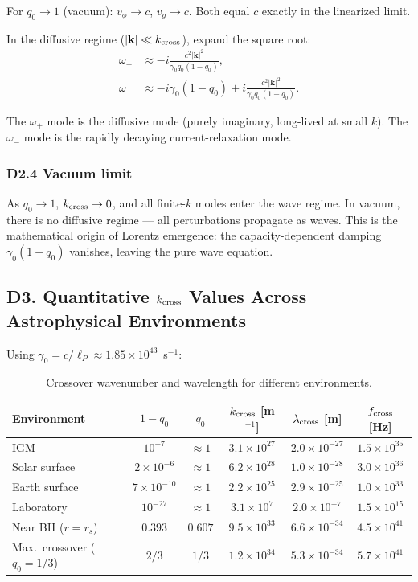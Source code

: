 \documentclass[reprint]{revtex4-2}
\begin{document}
For $q_0 \to 1$ (vacuum): $v_\phi \to c$, $v_g \to c$. Both equal $c$ exactly in the linearized limit.

In the diffusive regime ($|\mathbf{k}| \ll k_{\rm cross}$), expand the square root:
\begin{align}
\omega_+ &\approx -i\frac{c^2|\mathbf{k}|^2}{\gamma_0 q_0(1-q_0)}, \\
\omega_- &\approx -i\gamma_0(1-q_0) + i\frac{c^2|\mathbf{k}|^2}{\gamma_0 q_0(1-q_0)}.
\end{align}

The $\omega_+$ mode is the diffusive mode (purely imaginary, long-lived at small $k$). The $\omega_-$ mode is the rapidly decaying current-relaxation mode.

\subsubsection{D2.4 Vacuum limit}

As $q_0 \to 1$, $k_{\rm cross} \to 0$, and all finite-$k$ modes enter the wave regime. In vacuum, there is no diffusive regime --- all perturbations propagate as waves. This is the mathematical origin of Lorentz emergence: the capacity-dependent damping $\gamma_0(1-q_0)$ vanishes, leaving the pure wave equation.

\subsection{D3. Quantitative $k_{\rm cross}$ Values Across Astrophysical Environments}

Using $\gamma_0 = c/\ell_P \approx 1.85\times 10^{43}$~s$^{-1}$:

\begin{table}[h]
\caption{Crossover wavenumber and wavelength for different environments.}
\label{tab:kcross}
\small\setlength{\tabcolsep}{3pt}
\begin{tabular}{lccccc}
\toprule
Environment & $1-q_0$ & $q_0$ & $k_{\rm cross}$ [m$^{-1}$] & $\lambda_{\rm cross}$ [m] & $f_{\rm cross}$ [Hz] \\
\midrule
IGM & $10^{-7}$ & $\approx 1$ & $3.1{\times}10^{27}$ & $2.0{\times}10^{-27}$ & $1.5{\times}10^{35}$ \\
Solar surface & $2{\times}10^{-6}$ & $\approx 1$ & $6.2{\times}10^{28}$ & $1.0{\times}10^{-28}$ & $3.0{\times}10^{36}$ \\
Earth surface & $7{\times}10^{-10}$ & $\approx 1$ & $2.2{\times}10^{25}$ & $2.9{\times}10^{-25}$ & $1.0{\times}10^{33}$ \\
Laboratory & $10^{-27}$ & $\approx 1$ & $3.1{\times}10^{7}$ & $2.0{\times}10^{-7}$ & $1.5{\times}10^{15}$ \\
Near BH ($r{=}r_s$) & $0.393$ & $0.607$ & $9.5{\times}10^{33}$ & $6.6{\times}10^{-34}$ & $4.5{\times}10^{41}$ \\
Max.\ crossover ($q_0{=}1/3$) & $2/3$ & $1/3$ & $1.2{\times}10^{34}$ & $5.3{\times}10^{-34}$ & $5.7{\times}10^{41}$ \\
\bottomrule
\end{tabular}
\end{table}
\end{document}
